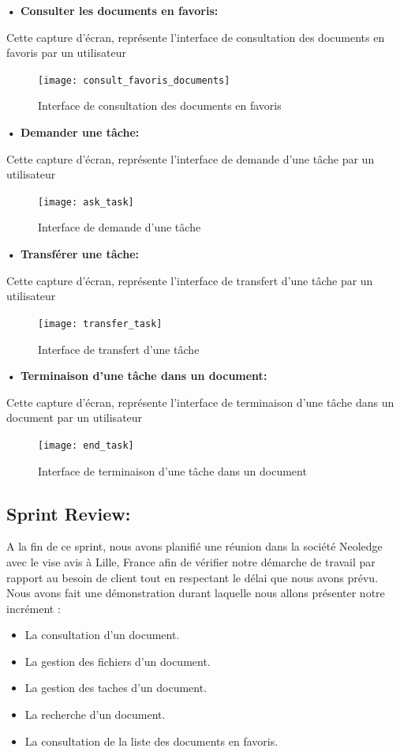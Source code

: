 \textbf{•	Consulter les documents en favoris:}

Cette capture d'écran, représente l'interface de consultation des documents en favoris par un utilisateur

\begin{figure}[H]
  \centering
  \texttt{[image: consult\_favoris\_documents]}
  \caption{Interface de consultation des documents en favoris}
  \label{fig:consult_favoris_documents}
\end{figure}

\textbf{•	Demander une tâche:}

Cette capture d'écran, représente l'interface de demande d'une tâche par un utilisateur

\begin{figure}[H]
  \centering
  \texttt{[image: ask\_task]}
  \caption{Interface de demande d'une tâche}
  \label{fig:ask_task}
\end{figure}

\textbf{•	Transférer une tâche:}

Cette capture d'écran, représente l'interface de transfert d'une tâche par un utilisateur

\begin{figure}[H]
  \centering
  \texttt{[image: transfer\_task]}
  \caption{Interface de transfert d'une tâche}
  \label{fig:transfer_task}
\end{figure}

\textbf{•	Terminaison d'une tâche dans un document:}

Cette capture d'écran, représente l'interface de terminaison d'une tâche dans un document par un utilisateur

\begin{figure}[H]
  \centering
  \texttt{[image: end\_task]}
  \caption{Interface de terminaison d'une tâche dans un document}
  \label{fig:end_task}
\end{figure}




\subsection{Sprint Review:}
A la fin de ce sprint, nous avons planifié une réunion dans la société Neoledge avec le vise avis à Lille, France afin de vérifier notre démarche de travail par rapport au besoin de client tout en respectant le délai que nous avons prévu.
Nous avons fait une démonstration durant laquelle nous allons présenter notre incrément :
\begin{itemize}
  \item La consultation d'un document.
  \item La gestion des fichiers d'un document.
  \item La gestion des taches d'un document.
  \item La recherche d'un document.
  \item La consultation de la liste des documents en favoris.
\end{itemize}

